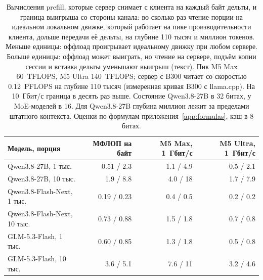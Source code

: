 \begin{table}[t]
\centering
\caption{Вычисления prefill, которые сервер снимает с клиента на каждый байт дельты, и граница выигрыша со стороны
канала: во сколько раз чтение порции на идеальном локальном движке, который работает на пике производительности
клиента, дольше передачи её дельты, на глубине 110 тысяч и миллион токенов. Меньше единицы: оффлоад проигрывает
идеальному движку при любом сервере. Больше единицы: оффлоад может выиграть, но чтение на сервере, подъём копии
сессии и вставка дельты уменьшают выигрыш (текст). Пик M5 Max 60~TFLOPS, M5 Ultra 140~TFLOPS; сервер с B300
читает со скоростью 0.12~PFLOPS на глубине 110 тысяч (измеренная кривая B300 с llama.cpp). На 10~Гбит/с граница в десять раз выше. Состояние Qwen3.8-27B в 32 битах, у MoE-моделей в 16. Для Qwen3.8-27B глубина
миллион лежит за пределами штатного контекста. Оценки по формулам приложения~\ref{app:formulas}, кэш в 8 битах.}
\label{tab:intensity}
\footnotesize
\begin{tabular}{lrrr}
\toprule
Модель, порция & МФЛОП на байт & M5 Max, 1~Гбит/с & M5 Ultra, 1~Гбит/с \\
\midrule
Qwen3.8-27B, 1 тыс. & 0.51 / 2.3 & 1.1 / 4.9 & 0.5 / 2.1 \\
Qwen3.8-27B, 10 тыс. & 1.9 / 8.8 & 4.0 / 18 & 1.7 / 7.9 \\
Qwen3.8-Flash-Next, 1 тыс. & 0.19 / 0.23 & 0.4 / 0.5 & 0.2 / 0.2 \\
Qwen3.8-Flash-Next, 10 тыс. & 0.73 / 0.88 & 1.5 / 1.8 & 0.7 / 0.8 \\
GLM-5.3-Flash, 1 тыс. & 0.60 / 0.85 & 1.3 / 1.8 & 0.5 / 0.8 \\
GLM-5.3-Flash, 10 тыс. & 3.6 / 5.1 & 7.6 / 11 & 3.2 / 4.6 \\
\bottomrule
\end{tabular}
\end{table}

